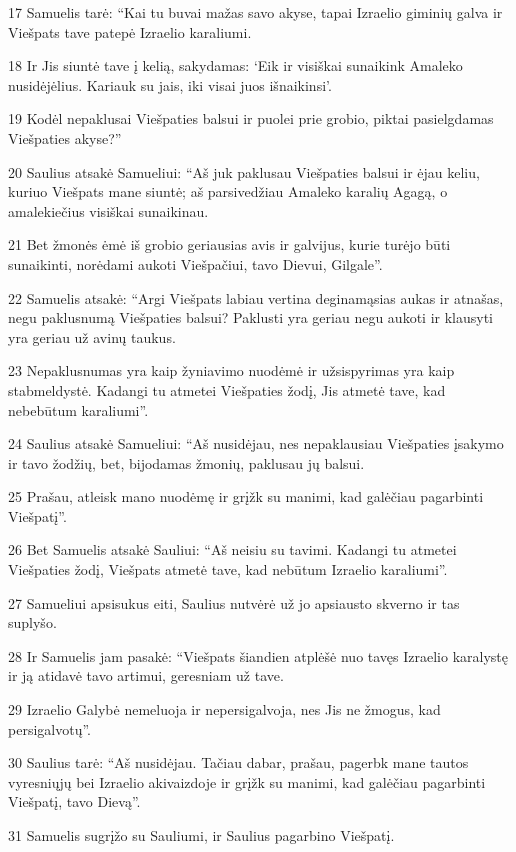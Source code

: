 \par 17 Samuelis tarė: “Kai tu buvai mažas savo akyse, tapai Izraelio giminių galva ir Viešpats tave patepė Izraelio karaliumi. 
\par 18 Ir Jis siuntė tave į kelią, sakydamas: ‘Eik ir visiškai sunaikink Amaleko nusidėjėlius. Kariauk su jais, iki visai juos išnaikinsi’. 
\par 19 Kodėl nepaklusai Viešpaties balsui ir puolei prie grobio, piktai pasielgdamas Viešpaties akyse?” 
\par 20 Saulius atsakė Samueliui: “Aš juk paklusau Viešpaties balsui ir ėjau keliu, kuriuo Viešpats mane siuntė; aš parsivedžiau Amaleko karalių Agagą, o amalekiečius visiškai sunaikinau. 
\par 21 Bet žmonės ėmė iš grobio geriausias avis ir galvijus, kurie turėjo būti sunaikinti, norėdami aukoti Viešpačiui, tavo Dievui, Gilgale”. 
\par 22 Samuelis atsakė: “Argi Viešpats labiau vertina deginamąsias aukas ir atnašas, negu paklusnumą Viešpaties balsui? Paklusti yra geriau negu aukoti ir klausyti yra geriau už avinų taukus. 
\par 23 Nepaklusnumas yra kaip žyniavimo nuodėmė ir užsispyrimas yra kaip stabmeldystė. Kadangi tu atmetei Viešpaties žodį, Jis atmetė tave, kad nebebūtum karaliumi”. 
\par 24 Saulius atsakė Samueliui: “Aš nusidėjau, nes nepaklausiau Viešpaties įsakymo ir tavo žodžių, bet, bijodamas žmonių, paklusau jų balsui. 
\par 25 Prašau, atleisk mano nuodėmę ir grįžk su manimi, kad galėčiau pagarbinti Viešpatį”. 
\par 26 Bet Samuelis atsakė Sauliui: “Aš neisiu su tavimi. Kadangi tu atmetei Viešpaties žodį, Viešpats atmetė tave, kad nebūtum Izraelio karaliumi”. 
\par 27 Samueliui apsisukus eiti, Saulius nutvėrė už jo apsiausto skverno ir tas suplyšo. 
\par 28 Ir Samuelis jam pasakė: “Viešpats šiandien atplėšė nuo tavęs Izraelio karalystę ir ją atidavė tavo artimui, geresniam už tave. 
\par 29 Izraelio Galybė nemeluoja ir nepersigalvoja, nes Jis ne žmogus, kad persigalvotų”. 
\par 30 Saulius tarė: “Aš nusidėjau. Tačiau dabar, prašau, pagerbk mane tautos vyresniųjų bei Izraelio akivaizdoje ir grįžk su manimi, kad galėčiau pagarbinti Viešpatį, tavo Dievą”. 
\par 31 Samuelis sugrįžo su Sauliumi, ir Saulius pagarbino Viešpatį. 

